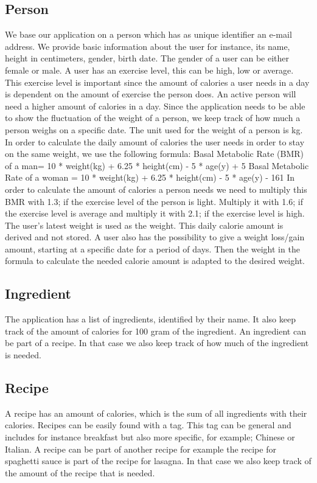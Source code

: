 \subsection{Person} 

We base our application on a person which has as unique identifier an e-mail address. We provide basic information about the user for instance, its  name, height in centimeters, gender, birth date. The gender of a user can be either female or male. A user has an exercise level, this can be high, low or average. This exercise level is important since the amount of calories a user needs in a day is dependent on the amount of exercise the person does. An active person will need a higher amount of calories in a day. Since the application needs to be able to show the fluctuation of the weight of a person, we keep track of how much a person weighs on a specific date. The unit used for the weight of a person is kg.  In order to calculate the daily amount of calories the user needs in order to stay on the same weight, we use the following formula: \newline
Basal Metabolic Rate (BMR) of a man= 10 * weight(kg) + 6.25 * height(cm) - 5 * age(y) + 5 \newline
Basal Metabolic Rate of a  woman = 10 * weight(kg) + 6.25 * height(cm) - 5 * age(y) - 161 \newline
In order to calculate the amount of calories a person needs we need to multiply this BMR with 1.3; if the exercise level of the person is light. Multiply it with 1.6; if the exercise level is average and multiply it with 2.1; if the exercise level is high. The user's latest weight is used as the weight. This daily calorie amount is derived and not stored. A user also has the possibility to give a weight loss/gain amount, starting at a specific date for a period of days. Then the weight in the formula to calculate the needed calorie amount is adapted to the desired weight. 

\subsection{Ingredient}
The application has a list of ingredients, identified by their name. It also keep track of the amount of calories for 100 gram of the ingredient. An ingredient can be part of a recipe. In that case we also keep track of how much of the ingredient is needed.

\subsection{Recipe}
 A recipe has an amount of calories, which is the sum of all ingredients with their calories. Recipes can be easily found with a tag. This tag can be general and includes for instance breakfast but also more specific, for example; Chinese or Italian. A recipe can be part of another recipe for example the recipe for spaghetti sauce is part of the recipe for lasagna. In that case we also keep track of the amount of the recipe that is needed.   


